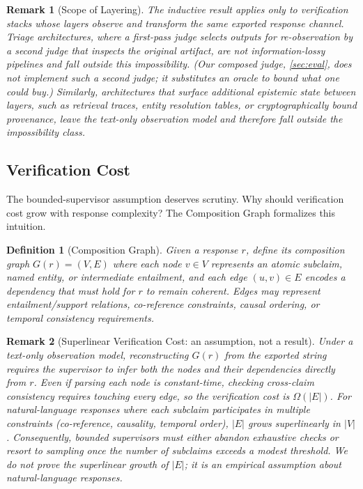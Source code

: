 \documentclass[11pt]{article}
\newtheorem{definition}{Definition}
\newtheorem{remark}{Remark}
\begin{document}
\begin{remark}[Scope of Layering]
The inductive result applies only to verification stacks whose layers observe
and transform the same exported response channel. Triage architectures, where
a first-pass judge selects outputs for re-observation by a second judge that
inspects the \emph{original} artifact, are not information-lossy pipelines and
fall outside this impossibility. (Our composed judge, \autoref{sec:eval}, does
not implement such a second judge; it substitutes an oracle to bound what one
could buy.) Similarly, architectures that surface additional
epistemic state between layers, such as retrieval traces, entity resolution
tables, or cryptographically bound provenance, leave the text-only observation
model and therefore fall outside the impossibility class.
\end{remark}

\subsection{Verification Cost}

The bounded-supervisor assumption deserves scrutiny. Why should verification
cost grow with response complexity? The Composition Graph formalizes this
intuition.

\begin{definition}[Composition Graph]
Given a response $r$, define its composition graph $G(r) = (V, E)$ where each
node $v \in V$ represents an atomic subclaim, named entity, or intermediate
entailment, and each edge $(u, v) \in E$ encodes a dependency that must hold for
$r$ to remain coherent. Edges may represent entailment/support relations,
co-reference constraints, causal ordering, or temporal consistency requirements.
\end{definition}

\begin{remark}[Superlinear Verification Cost: an assumption, not a result]\label{lem:superlinear}
Under a text-only observation model, reconstructing $G(r)$ from the exported
string requires the supervisor to infer both the nodes and their dependencies
directly from $r$. Even if parsing each node is constant-time, checking
cross-claim consistency requires touching every edge, so the verification cost
is $\Omega(|E|)$. For natural-language responses where each subclaim
participates in multiple constraints (co-reference, causality, temporal order),
$|E|$ grows superlinearly in $|V|$. Consequently, bounded supervisors must
either abandon exhaustive checks or resort to sampling once the number of
subclaims exceeds a modest threshold. We do not prove the superlinear growth of
$|E|$; it is an empirical assumption about natural-language responses.
\end{remark}
\end{document}
